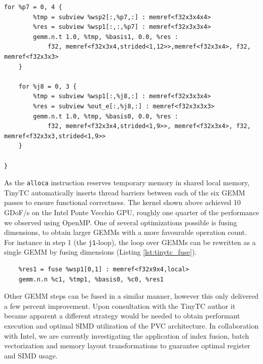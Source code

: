 \documentclass[a4paper,12pt]{article}
\begin{document}
\begin{lstlisting}[language=TensorIR,caption={BK1 using Tensor IR},basicstyle=\ttfamily\tiny,
                   label={lst:tinytc}]
    for %p7 = 0, 4 {
        %tmp = subview %wsp2[:,%p7,:] : memref<f32x3x4x4>
        %res = subview %wsp1[:,:,%p7] : memref<f32x3x3x4>
        gemm.n.t 1.0, %tmp, %basis1, 0.0, %res :
            f32, memref<f32x3x4,strided<1,12>>,memref<f32x3x4>, f32, memref<f32x3x3>
    }

    for %j8 = 0, 3 {
        %tmp = subview %wsp1[:,%j8,:] : memref<f32x3x3x4>
        %res = subview %out_e[:,%j8,:] : memref<f32x3x3x3>
        gemm.n.t 1.0, %tmp, %basis0, 0.0, %res :
            f32, memref<f32x3x4,strided<1,9>>, memref<f32x3x4>, f32, memref<f32x3x3,strided<1,9>>
    }
    
}
\end{lstlisting}

As the \texttt{alloca} instruction reserves temporary memory in shared local memory, TinyTC automatically inserts thread barriers between each of the six GEMM passes to ensure functional correctness. 
The kernel shown above achieved 10 GDoF/s on the Intel Ponte Vecchio GPU, roughly one quarter of the performance we observed using OpenMP. 
One of several optimizations possible is fusing dimensions, to obtain larger GEMMs with a more favourable operation count. 
For instance in step 1 (the \texttt{j1}-loop), the loop over GEMMs can be rewritten as a single GEMM by fusing dimensions (Listing \ref{lst:tinytc_fuse}).

\begin{lstlisting}[language=TensorIR,caption={BK1 using Tensor IR},basicstyle=\ttfamily\small,
                   label={lst:tinytc_fuse}]
    %tmp1 = fuse %in_e[0,1] : memref<f32x9x3>
    %res1 = fuse %wsp1[0,1] : memref<f32x9x4,local>    
    gemm.n.n %c1, %tmp1, %basis0, %c0, %res1
\end{lstlisting}

Other GEMM steps can be fused in a similar manner, however this only delivered a few percent improvement. Upon consultation with the TinyTC author it became apparent a different strategy would be needed to obtain performant execution and optimal SIMD utilization of the PVC architecture.
In collaboration with Intel, we are currently investigating the application of index fusion, batch vectorization and memory layout transformations to guarantee optimal register and SIMD usage.
\end{document}
